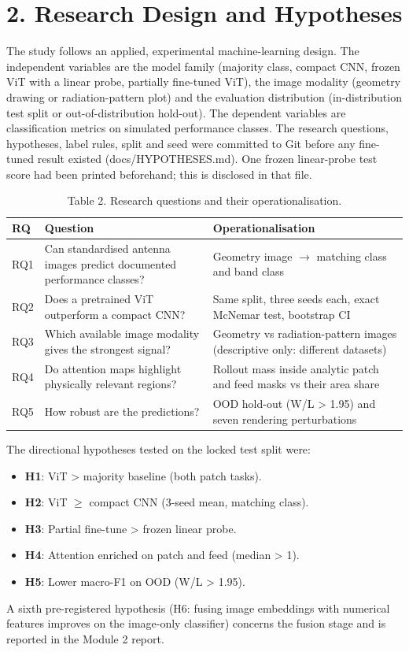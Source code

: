 \documentclass[11pt,a4paper]{article}
\begin{document}
\section*{2. Research Design and Hypotheses}
The study follows an applied, experimental machine-learning design. The independent variables are the model family (majority class, compact CNN, frozen ViT with a linear probe, partially fine-tuned ViT), the image modality (geometry drawing or radiation-pattern plot) and the evaluation distribution (in-distribution test split or out-of-distribution hold-out). The dependent variables are classification metrics on simulated performance classes. The research questions, hypotheses, label rules, split and seed were committed to Git before any fine-tuned result existed (docs/HYPOTHESES.md). One frozen linear-probe test score had been printed beforehand; this is disclosed in that file.

\begin{table}[H]\centering\small
\caption*{Table 2. Research questions and their operationalisation.}
\begin{tabularx}{\linewidth}{XXX}
\toprule
\textbf{RQ} & \textbf{Question} & \textbf{Operationalisation} \\
\midrule
RQ1 & Can standardised antenna images predict documented performance classes? & Geometry image $\rightarrow$ matching class and band class \\
RQ2 & Does a pretrained ViT outperform a compact CNN? & Same split, three seeds each, exact McNemar test, bootstrap CI \\
RQ3 & Which available image modality gives the strongest signal? & Geometry vs radiation-pattern images (descriptive only: different datasets) \\
RQ4 & Do attention maps highlight physically relevant regions? & Rollout mass inside analytic patch and feed masks vs their area share \\
RQ5 & How robust are the predictions? & OOD hold-out (W/L > 1.95) and seven rendering perturbations \\
\bottomrule
\end{tabularx}
\end{table}
The directional hypotheses tested on the locked test split were:

\begin{itemize}[leftmargin=*,itemsep=1pt]
\item \textbf{H1}: ViT > majority baseline (both patch tasks).
\item \textbf{H2}: ViT $\geq$ compact CNN (3-seed mean, matching class).
\item \textbf{H3}: Partial fine-tune > frozen linear probe.
\item \textbf{H4}: Attention enriched on patch and feed (median > 1).
\item \textbf{H5}: Lower macro-F1 on OOD (W/L > 1.95).
\end{itemize}
A sixth pre-registered hypothesis (H6: fusing image embeddings with numerical features improves on the image-only classifier) concerns the fusion stage and is reported in the Module 2 report.
\end{document}
